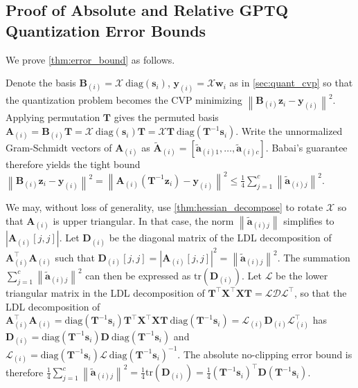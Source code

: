 \documentclass{article} %
\begin{document}
\subsection{Proof of Absolute and Relative GPTQ Quantization Error Bounds}
\label{sec:app_error_bound_proof}

We prove \cref{thm:error_bound} as follows.

Denote the basis $\bm{B}_{(i)}=\bm{\mathcal{X}} \mathrm{\ diag} \left( \bm{s}_{i} \right)$, $\bm{y}_{(i)} = \bm{\mathcal{X}} \bm{w}_{i}$
as in \cref{sec:quant_cvp} so that the quantization problem becomes the CVP minimizing
$\left\| \bm{B}_{(i)} \bm{z}_{i} - \bm{y}_{(i)} \right\|^{2}$.
Applying permutation $\bm{T}$ gives the permuted basis
$\bm{A}_{(i)} = \bm{B}_{(i)} \bm{T} = \bm{\mathcal{X}} \mathrm{\ diag} \left( \bm{s}_{i} \right) \bm{T} = \bm{\mathcal{X}} \bm{T} \mathrm{\ diag} \left( \bm{T}^{-1} \bm{s}_{i} \right)$.
Write the unnormalized Gram-Schmidt vectors of $\bm{A}_{(i)}$ as $\tilde{\bm{A}}_{(i)} = \left[ \tilde{\bm{a}}_{(i) 1}, \dots, \tilde{\bm{a}}_{(i) c} \right]$. Babai's guarantee therefore yields the tight bound $\left\| \bm{B}_{(i)} \bm{z}_{i} - \bm{y}_{(i)} \right\|^{2}
= \left\| \bm{A}_{(i)} \left( \bm{T}^{-1} \bm{z}_{i} \right) - \bm{y}_{(i)} \right\|^{2}
\le \frac{1}{4} \sum_{j=1}^{c} \left\| \tilde{\bm{a}}_{(i) j} \right\|^2$.

We may, without loss of generality, use \cref{thm:hessian_decompose} to rotate $\bm{\mathcal{X}}$ so that $\bm{A}_{(i)}$ is upper triangular.  In that case, the norm $\left\| \tilde{\bm{a}}_{(i) j} \right\|$ simplifies to $\left| \bm{A}_{(i)} [j, j] \right|$.
Let $\bm{D}_{(i)}$ be the diagonal matrix of the LDL decomposition of $\bm{A}_{(i)}^\top \bm{A}_{(i)}$ such that $\bm{D}_{(i)} [j, j]  = \left| \bm{A}_{(i)} [j, j] \right|^{2} = \left\| \tilde{\bm{a}}_{(i) j} \right\|^{2}$.
The summation $\sum_{j=1}^{c} \left\| \tilde{\bm{a}}_{(i) j} \right\|^2$ can then be expressed as $\mathrm{tr} \left( \bm{D}_{(i)} \right)$.
Let $\bm{\mathcal{L}}$ be the lower triangular matrix in the LDL decomposition of $\bm{T}^\top \bm{X}^\top \bm{X} \bm{T} = \bm{\mathcal{L}} \bm{\mathcal{D}} \bm{\mathcal{L}}^{\top}$,
so that the LDL decomposition of $\bm{A}_{(i)}^\top \bm{A}_{(i)} = \mathrm{diag} \left( \bm{T}^{-1} \bm{s}_{i} \right) \bm{T}^\top \bm{X}^\top \bm{X} \bm{T} \mathrm{\ diag} \left( \bm{T}^{-1} \bm{s}_{i} \right) = \bm{\mathcal{L}}_{(i)} \bm{D}_{(i)} \bm{\mathcal{L}}_{(i)}^\top$ has $\bm{D}_{(i)} = \mathrm{diag} \left( \bm{T}^{-1} \bm{s}_{i} \right) \bm{D} \mathrm{\ diag} \left( \bm{T}^{-1} \bm{s}_{i} \right)$ and $\bm{\mathcal{L}}_{(i)} = \mathrm{diag} \left( \bm{T}^{-1} \bm{s}_{i} \right) \bm{\mathcal{L}} \mathrm{\ diag} \left( \bm{T}^{-1} \bm{s}_{i} \right)^{-1}$.
The absolute no-clipping error bound is therefore $\frac{1}{4} \sum_{j=1}^{c} \left\| \tilde{\bm{a}}_{(i) j} \right\|^2 = \frac{1}{4} \mathrm{tr} \left( \bm{D}_{(i)} \right) = \frac{1}{4} \left( \bm{T}^{-1} \bm{s}_{i} \right)^\top \bm{D} \left( \bm{T}^{-1} \bm{s}_{i} \right)$.
\end{document}
